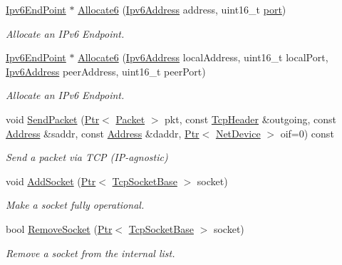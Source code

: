 \begin{DoxyCompactItemize}
\hyperlink{classns3_1_1Ipv6EndPoint}{Ipv6\+End\+Point} $\ast$ \hyperlink{classns3_1_1TcpL4Protocol_a4fa3c137089dc8f15ba7d920d1670cb2}{Allocate6} (\hyperlink{classns3_1_1Ipv6Address}{Ipv6\+Address} address, uint16\+\_\+t \hyperlink{visualizer-ideas_8txt_a21ff1c530daf8435e00048b7fc2c58e3}{port})
\begin{DoxyCompactList}\small\item\em Allocate an I\+Pv6 Endpoint. \end{DoxyCompactList}\item 
\hyperlink{classns3_1_1Ipv6EndPoint}{Ipv6\+End\+Point} $\ast$ \hyperlink{classns3_1_1TcpL4Protocol_a67227b5ea7384706647dd4d8a920c128}{Allocate6} (\hyperlink{classns3_1_1Ipv6Address}{Ipv6\+Address} local\+Address, uint16\+\_\+t local\+Port, \hyperlink{classns3_1_1Ipv6Address}{Ipv6\+Address} peer\+Address, uint16\+\_\+t peer\+Port)
\begin{DoxyCompactList}\small\item\em Allocate an I\+Pv6 Endpoint. \end{DoxyCompactList}\item 
void \hyperlink{classns3_1_1TcpL4Protocol_a622217854cad6fdfd562f42a6731ba6c}{Send\+Packet} (\hyperlink{classns3_1_1Ptr}{Ptr}$<$ \hyperlink{classns3_1_1Packet}{Packet} $>$ pkt, const \hyperlink{classns3_1_1TcpHeader}{Tcp\+Header} \&outgoing, const \hyperlink{classns3_1_1Address}{Address} \&saddr, const \hyperlink{classns3_1_1Address}{Address} \&daddr, \hyperlink{classns3_1_1Ptr}{Ptr}$<$ \hyperlink{classns3_1_1NetDevice}{Net\+Device} $>$ oif=0) const 
\begin{DoxyCompactList}\small\item\em Send a packet via T\+CP (I\+P-\/agnostic) \end{DoxyCompactList}\item 
void \hyperlink{classns3_1_1TcpL4Protocol_ae095cd8ab417acd8eba1fb0385720292}{Add\+Socket} (\hyperlink{classns3_1_1Ptr}{Ptr}$<$ \hyperlink{classns3_1_1TcpSocketBase}{Tcp\+Socket\+Base} $>$ socket)
\begin{DoxyCompactList}\small\item\em Make a socket fully operational. \end{DoxyCompactList}\item 
bool \hyperlink{classns3_1_1TcpL4Protocol_a1d5f0e4067f225e35e0b73ad2e80c5a9}{Remove\+Socket} (\hyperlink{classns3_1_1Ptr}{Ptr}$<$ \hyperlink{classns3_1_1TcpSocketBase}{Tcp\+Socket\+Base} $>$ socket)
\begin{DoxyCompactList}\small\item\em Remove a socket from the internal list. \end{DoxyCompactList}\item 

\end{DoxyCompactItemize}
